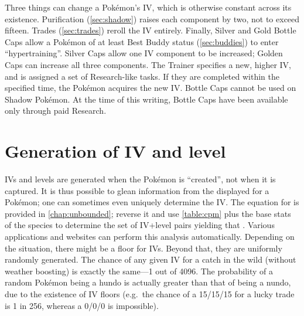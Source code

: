 Three things can change a Pokémon's IV, which is otherwise constant across its existence.
Purification (\autoref{sec:shadow}) raises each component by two, not to exceed fifteen.
Trades (\autoref{sec:trades}) reroll the IV entirely.
Finally, Silver and Gold Bottle Caps allow a Pokémon of at least Best Buddy status (\autoref{sec:buddies})
  to enter ``hypertraining''.
Silver Caps allow one IV component to be increased; Golden Caps can increase all three components.
The Trainer specifies a new, higher IV, and is assigned a set of Research-like tasks.
If they are completed within the specified time, the Pokémon acquires the new IV.
Bottle Caps cannot be used on Shadow Pokémon.
At the time of this writing, Bottle Caps have been available only through paid Research.

\section{Generation of IV and level\label{sec:ivgeneration}}
IVs and levels are generated when the Pokémon is ``created'', not when it is captured.
It is thus possible to glean information from the \CP{} displayed for a Pokémon;
  one can sometimes even uniquely determine the IV\@.
The equation for \CP{} is provided in \autoref{chap:unbounded}; reverse it and
  use \autoref{table:cpm} plus the base stats of the species to determine
  the set of IV+level pairs yielding that \CP\@.
Various applications and websites can perform this analysis automatically.
Depending on the situation, there might be a floor for IVs.
Beyond that, they are uniformly randomly generated.
The chance of any given IV for a catch in the wild (without weather boosting)
  is exactly the same---1 out of 4096.
The probability of a random Pokémon being a hundo is actually
  greater than that of being a nundo, due to the existence of IV floors
  (e.g.\ the chance of a 15/15/15 for a lucky trade is 1 in 256, whereas
  a 0/0/0 is impossible).
